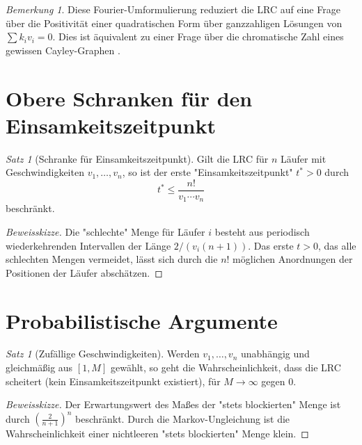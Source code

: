 \documentclass[12pt,a4paper]{amsart}
\theoremstyle{definition}
\theoremstyle{remark}
\newtheorem{satz}[theorem]{Satz}
\newtheorem{bemerkung}[theorem]{Bemerkung}
\begin{document}
\begin{bemerkung}
Diese Fourier-Umformulierung reduziert die LRC auf eine Frage über die Positivität
einer quadratischen Form über ganzzahligen Lösungen von $\sum k_i v_i = 0$.
Dies ist äquivalent zu einer Frage über die chromatische Zahl eines gewissen
Cayley-Graphen \cite{TothCayley2001}.
\end{bemerkung}

\section{Obere Schranken für den Einsamkeitszeitpunkt}\label{sec:obere_schranken}

\begin{satz}[Schranke für Einsamkeitszeitpunkt]\label{satz:einsamkeitszeit}
Gilt die LRC für $n$ Läufer mit Geschwindigkeiten $v_1, \ldots, v_n$, so ist
der erste "Einsamkeitszeitpunkt" $t^* > 0$ durch
\[
  t^* \leq \frac{n!}{v_1 \cdots v_n}
\]
beschränkt.
\end{satz}

\begin{proof}[Beweisskizze]
Die "schlechte" Menge für Läufer $i$ besteht aus periodisch wiederkehrenden
Intervallen der Länge $2/(v_i(n+1))$. Das erste $t > 0$, das alle schlechten Mengen
vermeidet, lässt sich durch die $n!$ möglichen Anordnungen der Positionen der
Läufer abschätzen.
\end{proof}

\section{Probabilistische Argumente}\label{sec:probabilistisch}

\begin{satz}[Zufällige Geschwindigkeiten]\label{satz:random}
Werden $v_1, \ldots, v_n$ unabhängig und gleichmäßig aus $[1, M]$ gewählt, so
geht die Wahrscheinlichkeit, dass die LRC scheitert (kein Einsamkeitszeitpunkt
existiert), für $M \to \infty$ gegen 0.
\end{satz}

\begin{proof}[Beweisskizze]
Der Erwartungswert des Maßes der "stets blockierten" Menge ist durch
$\left(\frac{2}{n+1}\right)^n$ beschränkt. Durch die Markov-Ungleichung ist die
Wahrscheinlichkeit einer nichtleeren "stets blockierten" Menge klein.
\end{proof}
\end{document}
